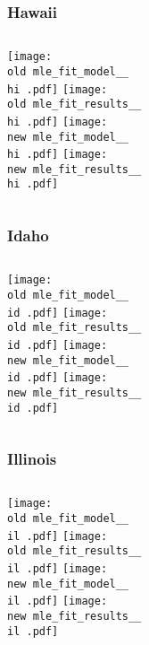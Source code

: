 \documentclass{beamer}
\newcommand{\old}{current_two_stage_output/pyseir/state_summaries/reports/}
\newcommand{\new}{new_shortest_t_delta/pyseir/state_summaries/reports/}
\newcommand{\hi}{Hawaii__15}
\newcommand{\id}{Idaho__16}
\newcommand{\il}{Illinois__17}
\begin{document}
\begin{frame}
\frametitle{Hawaii}
    \begin{columns}[t]

       \texttt{[image: \\old mle\_fit\_model\_\_\\hi .pdf]}
       \texttt{[image: \\old mle\_fit\_results\_\_\\hi .pdf]}   
       \texttt{[image: \\new mle\_fit\_model\_\_\\hi .pdf]}
       \texttt{[image: \\new mle\_fit\_results\_\_\\hi .pdf]}   
       
\end{columns}
\end{frame}

\begin{frame}
\frametitle{Idaho}
    \begin{columns}[t]

       \texttt{[image: \\old mle\_fit\_model\_\_\\id .pdf]}
       \texttt{[image: \\old mle\_fit\_results\_\_\\id .pdf]}   
       \texttt{[image: \\new mle\_fit\_model\_\_\\id .pdf]}
       \texttt{[image: \\new mle\_fit\_results\_\_\\id .pdf]}   
       
\end{columns}
\end{frame}

\begin{frame}
\frametitle{Illinois}
    \begin{columns}[t]

       \texttt{[image: \\old mle\_fit\_model\_\_\\il .pdf]}
       \texttt{[image: \\old mle\_fit\_results\_\_\\il .pdf]}   
       \texttt{[image: \\new mle\_fit\_model\_\_\\il .pdf]}
       \texttt{[image: \\new mle\_fit\_results\_\_\\il .pdf]}   
       
\end{columns}
\end{frame}
\end{document}

